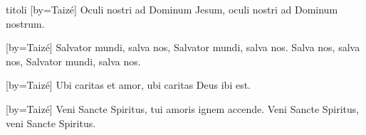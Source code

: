 \begin{songs}{titoli}
[by={Taizé}]
\beginverse*
Oculi nostri ad Dominum Jesum,
oculi nostri ad Dominum nostrum.
\endverse
\endsong

[by={Taizé}]
\beginverse*
Salvator mundi, salva nos,
Salvator mundi, salva nos.
Salva nos, salva nos,
Salvator mundi, salva nos.
\endverse
\endsong

[by={Taizé}]
\beginverse*
Ubi caritas et amor,
ubi caritas Deus ibi est.
\endverse
\endsong

[by={Taizé}]
\beginverse*
Veni Sancte Spiritus,
tui amoris ignem accende.
Veni Sancte Spiritus,
veni Sancte Spiritus.
\endverse
\endsong

\end{songs}
